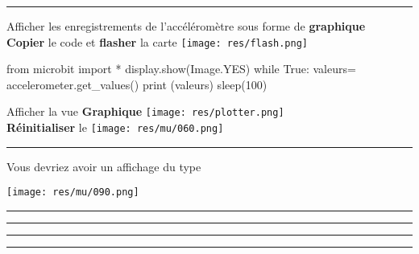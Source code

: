 \begin{minipage}[t]{0.5\linewidth}
\begin{methode}[Graphique]\rule{-0.25em}{1.6em}
	Afficher les enregistrements de l'accéléromètre sous forme de \textbf{graphique}
	\\[1em]


		\textbf{Copier} le code et 	
		\textbf{flasher} la carte 
		\hfill\texttt{[image: res/flash.png]}

		\begin{mucode}
from microbit import *
display.show(Image.YES)
while True:
	valeurs= accelerometer.get_values()
	print (valeurs)
	sleep(100)
		\end{mucode}
				
		Afficher la vue \textbf{Graphique}
		\hfill\texttt{[image: res/plotter.png]}\\
		\textbf{Réinitialiser} le \mb
		\hfill\texttt{[image: res/mu/060.png]}



\end{methode}
\end{minipage}
%
%
\begin{minipage}[t]{0.5\linewidth}
\begin{remarque}\rule{-0.25em}{1.6em}
	Vous devriez avoir un affichage du type\\
	
	\begin{center}
		
		\texttt{[image: res/mu/090.png]}	
	\end{center}
	
\end{remarque}
\end{minipage}


\begin{minipage}[t]{0.5\linewidth}
	\begin{methode}\rule{-0.25em}{1.6em}

	\rule{5em}{30em}

	\end{methode}
\end{minipage}
%
%
\begin{minipage}[t]{0.5\linewidth}
	\begin{methode}\rule{-0.25em}{1.6em}

	\rule{5em}{40em}

	\end{methode}
\end{minipage}
%
%